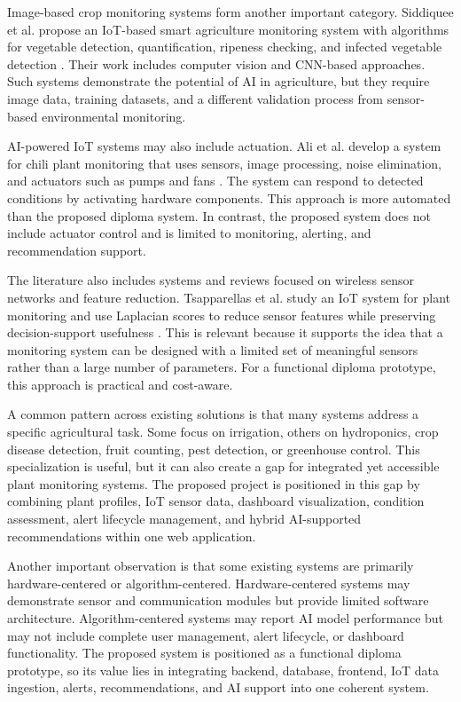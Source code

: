 Image-based crop monitoring systems form another important category. Siddiquee et al. propose an IoT-based smart agriculture monitoring system with algorithms for vegetable detection, quantification, ripeness checking, and infected vegetable detection \cite{siddiquee2022algorithms}. Their work includes computer vision and CNN-based approaches. Such systems demonstrate the potential of AI in agriculture, but they require image data, training datasets, and a different validation process from sensor-based environmental monitoring.

AI-powered IoT systems may also include actuation. Ali et al. develop a system for chili plant monitoring that uses sensors, image processing, noise elimination, and actuators such as pumps and fans \cite{ali2024automated}. The system can respond to detected conditions by activating hardware components. This approach is more automated than the proposed diploma system. In contrast, the proposed system does not include actuator control and is limited to monitoring, alerting, and recommendation support.

The literature also includes systems and reviews focused on wireless sensor networks and feature reduction. Tsapparellas et al. study an IoT system for plant monitoring and use Laplacian scores to reduce sensor features while preserving decision-support usefulness \cite{tsapparellas2020laplacian}. This is relevant because it supports the idea that a monitoring system can be designed with a limited set of meaningful sensors rather than a large number of parameters. For a functional diploma prototype, this approach is practical and cost-aware.

A common pattern across existing solutions is that many systems address a specific agricultural task. Some focus on irrigation, others on hydroponics, crop disease detection, fruit counting, pest detection, or greenhouse control. This specialization is useful, but it can also create a gap for integrated yet accessible plant monitoring systems. The proposed project is positioned in this gap by combining plant profiles, IoT sensor data, dashboard visualization, condition assessment, alert lifecycle management, and hybrid AI-supported recommendations within one web application.

Another important observation is that some existing systems are primarily hardware-centered or algorithm-centered. Hardware-centered systems may demonstrate sensor and communication modules but provide limited software architecture. Algorithm-centered systems may report AI model performance but may not include complete user management, alert lifecycle, or dashboard functionality. The proposed system is positioned as a functional diploma prototype, so its value lies in integrating backend, database, frontend, IoT data ingestion, alerts, recommendations, and AI support into one coherent system.

